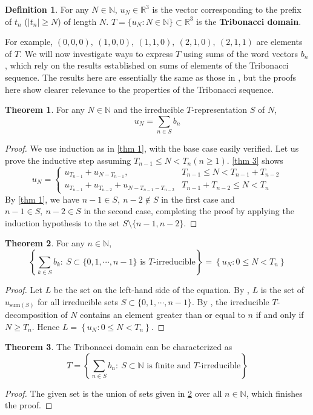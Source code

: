 \documentclass{article}
\theoremstyle{definition}
\newtheorem{theorem}{Theorem}
\newtheorem*{definition}{Definition}
\begin{document}
\begin{definition}
For any $N\in\mathbb{N}$, $u_N\in \mathbb{R}^3$ is the vector corresponding to the prefix of $t_n$ ($|t_n|\geq N$) of length $N$. $T=\{u_N:N\in \mathbb{N}\}\subset \mathbb{R}^3$  is the \textbf{Tribonacci domain}.
\end{definition}
For example, $(0,0,0),\ (1,0,0),\ (1,1,0),\ (2,1,0),\ (2,1,1)$ are elements of $T$. We will now investigate ways to express $T$ using sums of the word vectors $b_n$, which rely on the results established on sums of elements of the Tribonacci sequence. The results here are essentially the same as those in \cite{cow}, but the proofs here show clearer relevance to the properties of the Tribonacci sequence.
\begin{theorem}
\label{thm 4}
For any $N\in\mathbb{N}$ and the irreducible $T$-representation $S$ of $N$, \[ u_N=\sum_{n\in S} b_n\]
\end{theorem}
\begin{proof}
We use induction as in \cref{thm 1}, with the base case easily verified. Let us prove the inductive step assuming $T_{n-1}\leq N<T_n(n\geq 1)$. \cref{thm 3} shows \[u_N=\begin{cases}
    u_{T_{n-1}}+u_{N-T_{n-1}}, &T_{n-1}\leq N<T_{n-1}+T_{n-2}\\ 
    u_{T_{n-1}}+u_{T_{n-2}}+u_{N-T_{n-1}-T_{n-2}} &T_{n-1}+T_{n-2}\leq N<T_{n}
\end{cases}\]
By \cref{thm 1}, we have $n-1\in S,\ n-2\notin S$ in the first case and $n-1\in S,\ n-2\in S$ in the second case, completing the proof by applying the induction hypothesis to the set $S\setminus\{n-1, n-2\}$.
\end{proof}

\begin{theorem}
\label{thm 5-1}
For any $n\in\mathbb{N}$,
\[
\left\{ \sum_{k\in S}b_k:\ S\subset \{0,1,\cdots,n-1\}  \text{ is $T$-irreducible} \right\} = \left\{ u_N: 0\leq N<T_n \right\}
\]
\end{theorem}
\begin{proof}
Let $L$ be the set on the left-hand side of the equation. By , $L$ is the set of $u_{\text{sum}(S)}$ for all irreducible sets $S\subset\{0,1,\cdots,n-1\}$. By , the irreducible $T$-decomposition of $N$ contains an element greater than or equal to $n$ if and only if $N\geq T_n$. Hence $L=\left\{ u_N: 0\leq N<T_n \right\}$.
\end{proof}

\begin{theorem}
\label{thm 5} The Tribonacci domain can be characterized as
\[ 
T = \left\{ \sum_{n\in S}b_n:\ S\subset \mathbb{N}  \text{ is finite and $T$-irreducible} \right\}
\]
\end{theorem}
\begin{proof}
The given set is the union of sets given in \cref{thm 5-1} over all $n\in \mathbb{N}$, which finishes the proof.
\end{proof}
\end{document}
